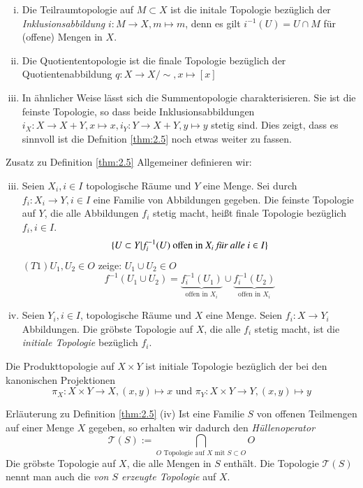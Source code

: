 \documentclass[a4paper,10pt]{scrartcl}
\begin{document}
\begin{exs*}
\begin{enumerate}[(i)]
\item Die Teilraumtopologie auf $M\subset X$ ist die initale Topologie bezüglich der \emph{Inklusionsabbildung} $ i:M\to X,m\mapsto m $, denn es gilt $ i^{-1}(U)=U\cap M $ für (offene) Mengen in $ X $.
\item Die Quotiententopologie ist die finale Topologie bezüglich der Quotientenabbildung  $ q: X\to X/\sim, x\mapsto [x] $
\item In ähnlicher Weise lässt sich die Summentopologie charakterisieren.  Sie ist die feinste Topologie, so dass beide Inklusionsabbildungen
$ i_X:X\to X+Y, x \mapsto x, i_Y: Y\to X+Y,y\mapsto y $ stetig sind.  Dies zeigt, dass es sinnvoll ist die Defnition \ref{thm:2.5} noch etwas weiter zu fassen.
\end{enumerate}
\end{exs*}
\begin{seg}{Zusatz zu Definition \ref{thm:2.5}}
Allgemeiner definieren wir:
\begin{enumerate}[(i)]
\setcounter{enumi}{2}
\item Seien $X_i, i\in I$ topologische Räume und $ Y $ eine Menge. Sei durch $f_i:X_i\to Y, i\in I$ eine Familie von Abbildungen gegeben. Die feinste Topologie auf $ Y $, die alle Abbildungen $f_i$ stetig macht, heißt finale Topologie bezüglich $ f_i,i\in I $.
\[
\{U\subset Y|f^{-1}_i(U) \text{ offen in }X_i \text{ \emph{für alle} } i\in I\}
\]
$(T1) U_1, U_2\in O$ zeige: $U_1\cup U_2\in O$
\[f^{-1}(U_1\cup U_2)=\underbrace{f^{-1}_i(U_1)}_{\text{offen in } X_i}\cup \underbrace{f^{-1}_i(U_2)}_{\text{offen in } X_i}\]
\item Seien $ Y_i, i\in I $, topologische Räume und $ X $ eine Menge.  Seien $ f_i: X\to Y_i $ Abbildungen.  Die gröbste Topologie auf $ X $, die alle $f_i$ stetig macht, ist die \emph{initiale Topologie} bezüglich $f_i$. 
\end{enumerate}
\end{seg}
\begin{ex*}
Die Produkttopologie auf $ X\times Y $ ist initiale Topologie bezüglich der bei den kanonischen Projektionen
\[
\pi_X:X\times Y \to X, (x,y)\mapsto x \text{ und } \pi_Y: X\times Y\to Y, (x,y)\mapsto y 
\]
\end{ex*}
\begin{seg}{Erläuterung zu Definition \ref{thm:2.5} (iv)} 
Ist eine Familie $ S $ von offenen Teilmengen auf einer Menge $ X $ gegeben, so erhalten wir dadurch den \emph{Hüllenoperator} 
\[ 
\mathcal T(S):=\bigcap\limits_{ O \text{ Topologie auf } X \text{ mit } S\subset O} O 
\]
Die gröbste Topologie auf $ X $, die alle Mengen in $ S $ enthält. Die Topologie $ \mathcal T(S) $ nennt man auch die \emph{von $ S $ erzeugte Topologie} auf $ X $.
\end{seg}
\end{document}
